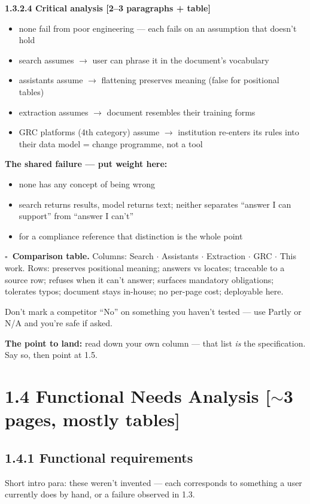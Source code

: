 \documentclass[11pt,a4paper]{article}
\newcommand{\turn}[1]{\par\vspace{3pt}\noindent\textbf{The point to land:} #1\par}
\newcommand{\len}[1]{\hfill\textcolor{gr}{\small[#1]}}
\newcommand{\todo}{$\square$~}
\begin{document}
\textbf{1.3.2.4 Critical analysis \len{2--3 paragraphs + table}}
\begin{itemize}
\item none fail from poor engineering --- each fails on an assumption that doesn't hold
\item search assumes $\rightarrow$ user can phrase it in the document's vocabulary
\item assistants assume $\rightarrow$ flattening preserves meaning (false for positional tables)
\item extraction assumes $\rightarrow$ document resembles their training forms
\item GRC platforms (4th category) assume $\rightarrow$ institution re-enters its rules
into their data model = change programme, not a tool
\end{itemize}
\textbf{The shared failure --- put weight here:}
\begin{itemize}
\item none has any concept of being wrong
\item search returns results, model returns text; neither separates
``answer I can support'' from ``answer I can't''
\item for a compliance reference that distinction is the whole point
\end{itemize}

\textbf{\todo Comparison table.} Columns: Search $\cdot$ Assistants $\cdot$
Extraction $\cdot$ GRC $\cdot$ This work. Rows: preserves positional meaning;
answers vs locates; traceable to a source row; refuses when it can't answer;
surfaces mandatory obligations; tolerates typos; document stays in-house; no
per-page cost; deployable here.

\textcolor{gr}{\small Don't mark a competitor ``No'' on something you haven't tested
--- use Partly or N/A and you're safe if asked.}

\turn{read down your own column --- that list \emph{is} the specification. Say so, then point at 1.5.}

\newpage
\section*{1.4 Functional Needs Analysis \len{$\sim$3 pages, mostly tables}}

\subsection*{1.4.1 Functional requirements}
Short intro para: these weren't invented --- each corresponds to something a user
currently does by hand, or a failure observed in 1.3.
\end{document}
